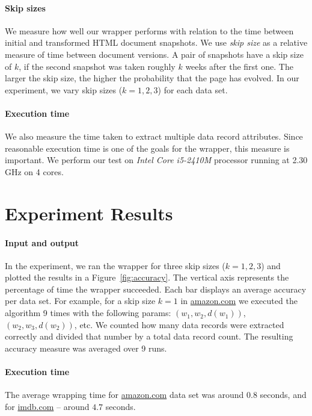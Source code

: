 \paragraph{Skip sizes} We measure how well our wrapper performs with relation to the time between initial and transformed HTML document snapshots. We use \emph{skip size} as a relative measure of time between document versions. A pair of snapshots have a skip size of $k$, if the second snapshot was taken roughly $k$ weeks after the first one. The larger the skip size, the higher the probability that the page has evolved. In our experiment, we vary skip sizes ($k = 1, 2, 3$) for each data set.

\paragraph{Execution time} We also measure the time taken to extract multiple data record attributes. Since reasonable execution time is one of the goals for the wrapper, this measure is important. We perform our test on \emph{Intel Core i5-2410M} processor running at 2.30 GHz on 4 cores.


\section{Experiment Results}

\paragraph{Input and output} In the experiment, we ran the wrapper for three skip sizes ($k = 1, 2, 3$) and plotted the results in a Figure~\ref{fig:accuracy}. The vertical axis represents the percentage of time the wrapper succeeded. Each bar displays an average accuracy per data set. For example, for a skip size $k=1$ in \url{amazon.com} we executed the algorithm 9 times with the following params: $(w_1,w_2,d(w_1))$, $(w_2,w_3,d(w_2))$, etc. We counted how many data records were extracted correctly and divided that number by a total data record count. The resulting accuracy measure was averaged over 9 runs.

\paragraph{Execution time} The average wrapping time for \url{amazon.com} data set was around $0.8$ seconds, and for \url{imdb.com} -- around $4.7$ seconds.

